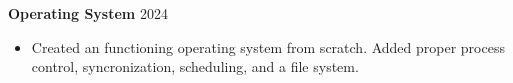 \textbf{Operating System} \hfill 2024 \par
\begin{itemize}
\item Created an functioning operating system  from scratch. Added proper process control, syncronization, scheduling, and a file system.
\end{itemize} \par
